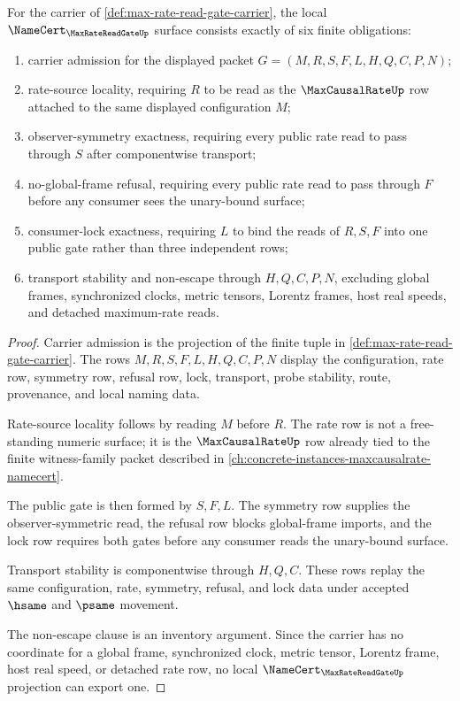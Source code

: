\begin{theorem}
\label{thm:max-rate-read-gate-namecert-obligations}
For the carrier of \autoref{def:max-rate-read-gate-carrier}, the local $\NameCert_{\MaxRateReadGateUp}$ surface consists exactly of six finite obligations:
\begin{enumerate}
\item carrier admission for the displayed packet $G=(M,R,S,F,L,H,Q,C,P,N)$;
\item rate-source locality, requiring $R$ to be read as the $\MaxCausalRateUp$ row attached to the same displayed configuration $M$;
\item observer-symmetry exactness, requiring every public rate read to pass through $S$ after componentwise transport;
\item no-global-frame refusal, requiring every public rate read to pass through $F$ before any consumer sees the unary-bound surface;
\item consumer-lock exactness, requiring $L$ to bind the reads of $R,S,F$ into one public gate rather than three independent rows;
\item transport stability and non-escape through $H,Q,C,P,N$, excluding global frames, synchronized clocks, metric tensors, Lorentz frames, host real speeds, and detached maximum-rate reads.
\end{enumerate}
\end{theorem}
\begin{proof}
Carrier admission is the projection of the finite tuple in \autoref{def:max-rate-read-gate-carrier}. The rows $M,R,S,F,L,H,Q,C,P,N$ display the configuration, rate row, symmetry row, refusal row, lock, transport, probe stability, route, provenance, and local naming data.

Rate-source locality follows by reading $M$ before $R$. The rate row is not a free-standing numeric surface; it is the $\MaxCausalRateUp$ row already tied to the finite witness-family packet described in \autoref{ch:concrete-instances-maxcausalrate-namecert}.

The public gate is then formed by $S,F,L$. The symmetry row supplies the observer-symmetric read, the refusal row blocks global-frame imports, and the lock row requires both gates before any consumer reads the unary-bound surface.

Transport stability is componentwise through $H,Q,C$. These rows replay the same configuration, rate, symmetry, refusal, and lock data under accepted $\hsame$ and $\psame$ movement.

The non-escape clause is an inventory argument. Since the carrier has no coordinate for a global frame, synchronized clock, metric tensor, Lorentz frame, host real speed, or detached rate row, no local $\NameCert_{\MaxRateReadGateUp}$ projection can export one.
\end{proof}


